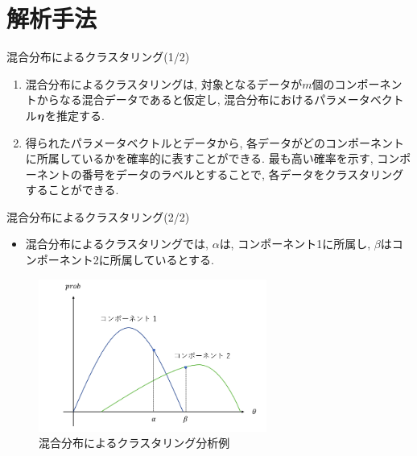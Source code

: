 \documentclass[dvipdfmx]{beamer} %
\newcommand{\bm}[1]{\mbox{\boldmath $#1$}}
\begin{document}
\section{解析手法}
\begin{frame}{混合分布によるクラスタリング(1/2)}
\begin{enumerate}
\item
混合分布によるクラスタリングは, 対象となるデータが$m$個のコンポーネントからなる混合データであると仮定し, 混合分布におけるパラメータベクトル$\bm \eta$を推定する. 
\item
得られたパラメータベクトルとデータから, 各データがどのコンポーネントに所属しているかを確率的に表すことができる. 最も高い確率を示す, コンポーネントの番号をデータのラベルとすることで, 各データをクラスタリングすることができる.　
 
\end{enumerate}

\end{frame}

\begin{frame}{混合分布によるクラスタリング(2/2)}

\begin{itemize}
	\item 混合分布によるクラスタリングでは, $\alpha$は, コンポーネント1に所属し, $\beta$はコンポーネント2に所属しているとする.
\end{itemize}
\begin{figure}[tbp]
\begin{center}
\includegraphics[clip,height= 50mm]{data/mix_cluster.png}
\end{center}
\caption{混合分布によるクラスタリング分析例}
\label{mix_cluster}
\end{figure}


\end{frame}
\end{document}
